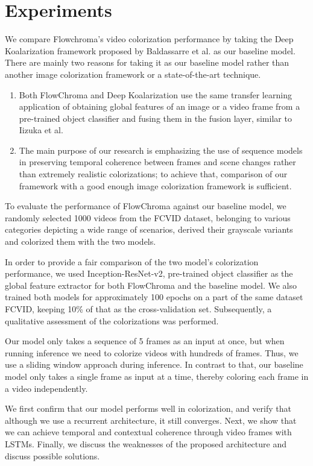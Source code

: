\documentclass[10pt,twocolumn,letterpaper]{article}
\begin{document}
\section{Experiments}
We compare Flowchroma's video colorization performance by taking the Deep Koalarization framework proposed by Baldassarre et al. as our baseline model. There are mainly two reasons for taking it as our baseline model rather than another image colorization framework or a state-of-the-art technique.
\begin{enumerate}
\item Both FlowChroma and Deep Koalarization use the same transfer learning application of obtaining global features of an image or a video frame from a pre-trained object classifier and fusing them in the fusion layer, similar to Iizuka et al. 
\item The main purpose of our research is emphasizing the use of sequence models in preserving temporal coherence between frames and scene changes rather than extremely realistic colorizations; to achieve that, comparison of our framework with a good enough image colorization framework is sufficient.
\end{enumerate}

To evaluate the performance of FlowChroma against our baseline model, we randomly selected 1000 videos from the FCVID dataset, belonging to various categories depicting a wide range of scenarios, derived their grayscale variants and colorized them with the two models.

In order to provide a fair comparison of the two model's colorization performance, we used Inception-ResNet-v2, pre-trained object classifier as the global feature extractor for both FlowChroma and the baseline model. We also trained both models for approximately 100 epochs on a part of the same dataset FCVID, keeping 10\% of that as the cross-validation set. Subsequently, a qualitative assessment of the colorizations was performed. 

Our model only takes a sequence of 5 frames as an input at once, but when running inference we need to colorize videos with hundreds of frames. Thus, we use a sliding window approach during inference. In contrast to that, our baseline model only takes a single frame as input at a time, thereby coloring each frame in a video independently.

We first confirm that our model performs well in colorization, and verify that although we use a recurrent architecture, it still converges. Next, we show that we can achieve temporal and contextual coherence through video frames with LSTMs. Finally, we discuss the weaknesses of the proposed architecture and discuss possible solutions.
\end{document}

